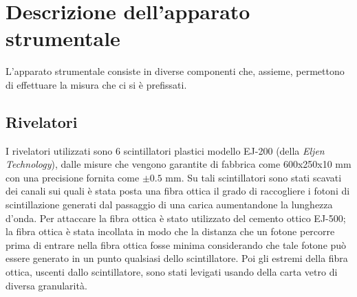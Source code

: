 \section{Descrizione dell'apparato strumentale}
L'apparato strumentale consiste in diverse componenti che, assieme, permettono di effettuare la misura che ci si è prefissati. 
\subsection{Rivelatori}
I rivelatori utilizzati sono 6 scintillatori plastici modello EJ-200 (della \textit{Eljen Technology}), dalle misure che vengono garantite di fabbrica come
600x250x10 mm con una precisione fornita come $\pm 0.5$ mm. Su tali scintillatori sono stati scavati dei canali sui quali è stata  posta una fibra ottica il grado di raccogliere
i fotoni di scintillazione generati dal passaggio di una carica aumentandone la lunghezza d'onda. Per attaccare la fibra ottica è stato utilizzato del cemento ottico EJ-500; la fibra ottica è stata
incollata in modo che la distanza che un fotone percorre prima di entrare nella fibra ottica fosse minima considerando che tale fotone può essere generato in un punto qualsiasi
dello scintillatore. Poi gli estremi della fibra ottica, uscenti dallo scintillatore, sono stati levigati usando della carta vetro di diversa granularit\`a.\\

